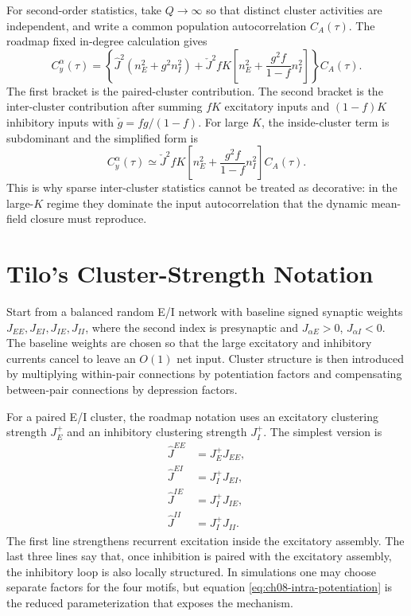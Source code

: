 For second-order statistics, take \(Q\to\infty\) so that distinct cluster
activities are independent, and write a common population autocorrelation
\(C_A(\tau)\). The roadmap fixed in-degree calculation gives
\begin{equation}
    C_y^\alpha(\tau)
    =
    \left\{
        \widehat J^2\left(n_E^2+g^2n_I^2\right)
        +
        \check J^2 fK
        \left[
            n_E^2+\frac{g^2 f}{1-f}n_I^2
        \right]
    \right\}
    C_A(\tau).
    \label{eq:ch08-fixed-degree-autocorrelation}
\end{equation}
The first bracket is the paired-cluster contribution. The second bracket is
the inter-cluster contribution after summing \(fK\) excitatory inputs and
\((1-f)K\) inhibitory inputs with \(\check g=fg/(1-f)\). For large \(K\), the
inside-cluster term is subdominant and the simplified form is
\begin{equation}
    C_y^\alpha(\tau)
    \simeq
    \check J^2 fK
    \left[
        n_E^2+\frac{g^2 f}{1-f}n_I^2
    \right]
    C_A(\tau).
    \label{eq:ch08-large-k-autocorrelation}
\end{equation}
This is why sparse inter-cluster statistics cannot be treated as decorative:
in the large-\(K\) regime they dominate the input autocorrelation that the
dynamic mean-field closure must reproduce.

\section{Tilo's Cluster-Strength Notation}
\label{sec:ch08-tilo-notation}

Start from a balanced random E/I network with baseline signed synaptic weights
\(J_{EE},J_{EI},J_{IE},J_{II}\), where the second index is presynaptic and
\(J_{\alpha E}>0\), \(J_{\alpha I}<0\). The baseline weights are chosen so that
the large excitatory and inhibitory currents cancel to leave an \(O(1)\) net
input. Cluster structure is then introduced by multiplying within-pair
connections by potentiation factors and compensating between-pair connections
by depression factors.

For a paired E/I cluster, the roadmap notation uses an excitatory clustering
strength \(J_E^+\) and an inhibitory clustering strength \(J_I^+\). The simplest
version is
\begin{equation}
\begin{aligned}
    \widehat J^{EE} &= J_E^+ J_{EE},\\
    \widehat J^{EI} &= J_I^+ J_{EI},\\
    \widehat J^{IE} &= J_I^+ J_{IE},\\
    \widehat J^{II} &= J_I^+ J_{II}.
\end{aligned}
\label{eq:ch08-intra-potentiation}
\end{equation}
The first line strengthens recurrent excitation inside the excitatory assembly.
The last three lines say that, once inhibition is paired with the excitatory
assembly, the inhibitory loop is also locally structured. In simulations one
may choose separate factors for the four motifs, but equation
\cref{eq:ch08-intra-potentiation} is the reduced parameterization that exposes
the mechanism.

